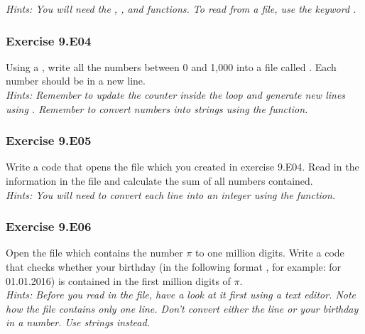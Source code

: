 \textit{Hints:
You will need the {}, {}, and {} functions. To read from a file, use the keyword {}.}\\[1cm]


\subsubsection*{Exercise 9.E04}
Using a {}, write all the numbers between 0 and 1,000 into a file called
{}. Each number should be in a new line.\\


\textit{Hints:
Remember to update the counter inside the {} loop and generate new lines using {}. Remember to convert numbers into strings using the {} function.}\\[1cm]


\subsubsection*{Exercise 9.E05}
Write a code that opens the file {} which you created in
exercise 9.E04. Read in the information in the file and calculate the sum of all numbers
contained.\\

\textit{Hints:
You will need to convert each line into an integer using the {} function.}\\[1cm]


\subsubsection*{Exercise 9.E06}
Open the file {} which contains the number $\pi$ to one million digits. Write a code that checks whether your birthday (in the following format {}, for example: {} for 01.01.2016) is contained in the first million digits of $\pi$.\\


\textit{Hints:
Before you read in the file, have a look at it first using a text editor. Note how the file
contains only one line. Don’t convert either the line or your birthday in a number. Use strings instead.}\\[1cm]

